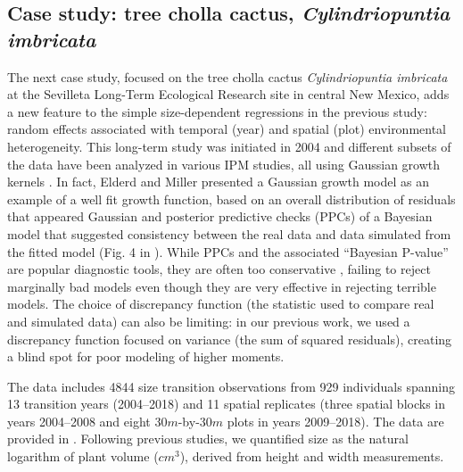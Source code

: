 \documentclass[12pt]{article}
\begin{document}
\begin{spacing}{1.9}
\section{Case study: tree cholla cactus, \emph{Cylindriopuntia imbricata}}
\label{sec:cactusCaseStudy} 
The next case study, focused on the tree cholla cactus \emph{Cylindriopuntia imbricata} at the Sevilleta Long-Term Ecological Research site in central New Mexico, adds a new feature to the simple size-dependent regressions in the previous study: random effects associated with temporal (year) and spatial (plot) environmental heterogeneity. 
This long-term study was initiated in 2004 and different subsets of the data have been analyzed in various IPM studies, all using Gaussian growth kernels  \citep{miller2009impacts,czachurademographic,compagnoni2016effect,ohm2014balancing,elderd2016quantifying}.
In fact, Elderd and Miller \citeyear{elderd2016quantifying} presented a Gaussian growth model as an example of a well fit growth function, based on an overall distribution of residuals that appeared Gaussian and posterior predictive checks (PPCs) of a Bayesian model that suggested consistency between the real data and data simulated from the fitted model (Fig. 4 in \citep{elderd2016quantifying}). 
While PPCs and the associated ``Bayesian P-value'' are popular diagnostic tools, they are often too conservative \citep{conn2018guide,zhang2014comparative}, failing to reject marginally bad models even though they are very effective in rejecting terrible models.
The choice of discrepancy function (the statistic used to compare real and simulated data) can also be limiting: in our previous work, we used a discrepancy function focused on variance (the sum of squared residuals), creating a blind spot for poor modeling of higher moments.

The data includes 4844 size transition observations from 929 individuals spanning 13 transition years (2004--2018) and 11 spatial replicates (three spatial blocks in years 2004--2008 and eight $30m$-by-$30m$ plots in years 2009--2018). 
The data are provided in \cite{cactusdata}.
Following previous studies, we quantified size as the natural logarithm of plant volume ($cm^3$), derived from height and width measurements. 


\end{spacing}
\end{document}

